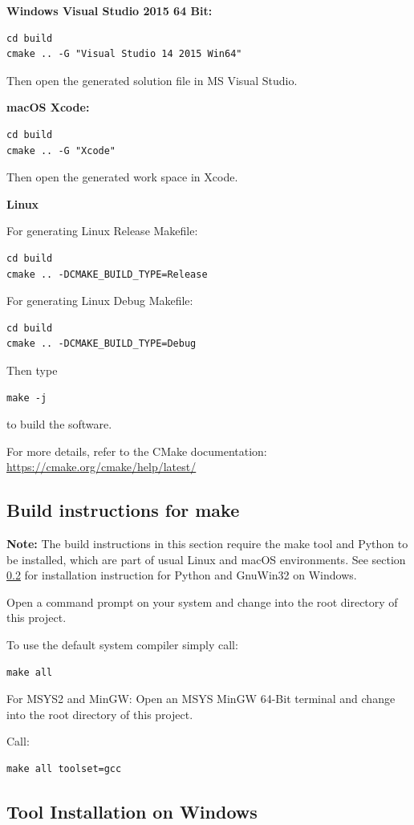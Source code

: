 \documentclass[a4paper,11pt]{jvetdoc}
\begin{document}
\textbf{Windows Visual Studio 2015 64 Bit:}
\begin{verbatim}
cd build
cmake .. -G "Visual Studio 14 2015 Win64"
\end{verbatim}
Then open the generated solution file in MS Visual Studio.

\textbf{macOS Xcode:}
\begin{verbatim}
cd build
cmake .. -G "Xcode"
\end{verbatim}
Then open the generated work space in Xcode.

\textbf{Linux}

For generating Linux Release Makefile:
\begin{verbatim}
cd build
cmake .. -DCMAKE_BUILD_TYPE=Release
\end{verbatim}
For generating Linux Debug Makefile:
\begin{verbatim}
cd build
cmake .. -DCMAKE_BUILD_TYPE=Debug
\end{verbatim}
Then type
\begin{verbatim}
make -j
\end{verbatim}
to build the software.

For more details, refer to the CMake documentation: \url{https://cmake.org/cmake/help/latest/}

\subsection {Build instructions for make}

\textbf{Note:}
The build instructions in this section require the make tool and Python
to be installed, which are part of usual Linux and macOS environments. 
See section \ref{windowsinstall} for installation instruction for Python 
and GnuWin32 on Windows.

Open a command prompt on your system and change into the root directory
of this project.

To use the default system compiler simply call:
\begin{verbatim}
make all
\end{verbatim}
For MSYS2 and MinGW:
Open an MSYS MinGW 64-Bit terminal and change into the root directory
of this project.

Call:
\begin{verbatim}
make all toolset=gcc
\end{verbatim}

\subsection{Tool Installation on Windows}
\label{windowsinstall}
\end{document}
